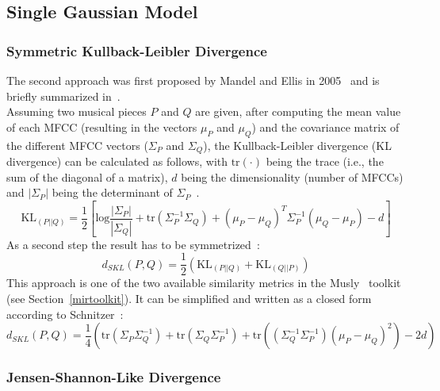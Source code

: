 \subsection{Single Gaussian Model}

\subsubsection{Symmetric Kullback-Leibler Divergence}\label{klth}

The second approach was first proposed by Mandel and Ellis in 2005~\cite{mandelellis1} and is briefly summarized in~\cite[pp. 65f]{knees1}.\\
Assuming two musical pieces $P$ and $Q$ are given, after computing the mean value of each MFCC (resulting in the vectors $\mu_P$ and $\mu_Q$) and the covariance matrix of the different MFCC vectors ($\Sigma_P$ and $\Sigma_Q$), the Kullback-Leibler divergence (KL divergence) can be calculated as follows, with $\text{tr}(\cdot)$ being the trace (i.e., the sum of the diagonal of a matrix), $d$ being the dimensionality (number of MFCCs) and $|\Sigma_P|$ being the determinant of $\Sigma_P$~\cite[pp. 65f]{knees1}.\\
\begin{equation} \label{eq:KL1}
\text{KL}_{(P||Q)} = \frac{1}{2}[\text{log}\frac{|\Sigma_P|}{|\Sigma_Q|} + \text{tr}(\Sigma_P^{-1}\Sigma_Q) + (\mu_P - \mu_Q)^T \Sigma_P^{-1} (\mu_Q - \mu_P) - d]
\end{equation}
As a second step the result has to be symmetrized~\cite[p. 44]{schnitzer1}:
\begin{equation} \label{eq:KL2}
d_{SKL}(P, Q) = \frac{1}{2} (\text{KL}_{(P||Q)} + \text{KL}_{(Q||P)})
\end{equation}
This approach is one of the two available similarity metrics in the Musly~\cite{musly1} toolkit (see Section~\ref{mirtoolkit}). It can be simplified and written as a closed form according to Schnitzer~\cite[p. 44]{schnitzer1}:
\begin{equation} \label{eq:SKL}
d_{SKL}(P, Q) = \frac{1}{4} (\text{tr}(\Sigma_P\Sigma_Q^{-1}) + \text{tr}(\Sigma_Q\Sigma_P^{-1}) + \text{tr}((\Sigma_Q^{-1}\Sigma_P^{-1})(\mu_P - \mu_Q)^2) - 2d)
\end{equation}

\subsubsection{Jensen-Shannon-Like Divergence}

